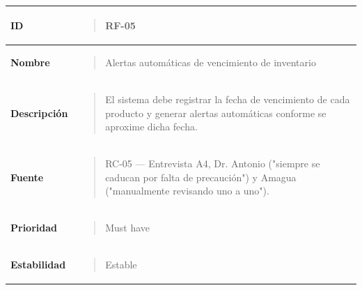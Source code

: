 \documentclass[
]{article}
\newcounter{none} %
\begin{document}
{\def\LTcaptype{none} %
\begin{longtable}[]{@{}
  >{\raggedright\arraybackslash}p{}
  >{\raggedright\arraybackslash}p{}@{}}
\toprule\noalign{}
\begin{minipage}[b]{\linewidth}\raggedright
\textbf{ID}
\end{minipage} & \begin{minipage}[b]{\linewidth}\raggedright
\begin{quote}
RF-05
\end{quote}
\end{minipage} \\
\midrule\noalign{}
\endhead
\bottomrule\noalign{}
\endlastfoot
\textbf{Nombre} & \begin{minipage}[t]{\linewidth}\raggedright
\begin{quote}
Alertas automáticas de vencimiento de inventario
\end{quote}
\end{minipage} \\
\textbf{Descripción} & \begin{minipage}[t]{\linewidth}\raggedright
\begin{quote}
El sistema debe registrar la fecha de vencimiento de cada producto y
generar alertas automáticas conforme se aproxime dicha fecha.
\end{quote}
\end{minipage} \\
\textbf{Fuente} & \begin{minipage}[t]{\linewidth}\raggedright
\begin{quote}
RC-05 --- Entrevista A4, Dr. Antonio ("siempre se caducan por falta de
precaución") y Amagua ("manualmente revisando uno a uno").
\end{quote}
\end{minipage} \\
\textbf{Prioridad} & \begin{minipage}[t]{\linewidth}\raggedright
\begin{quote}
Must have
\end{quote}
\end{minipage} \\
\textbf{Estabilidad} & \begin{minipage}[t]{\linewidth}\raggedright
\begin{quote}
Estable
\end{quote}
\end{minipage} \\

\end{longtable}}
\end{document}
